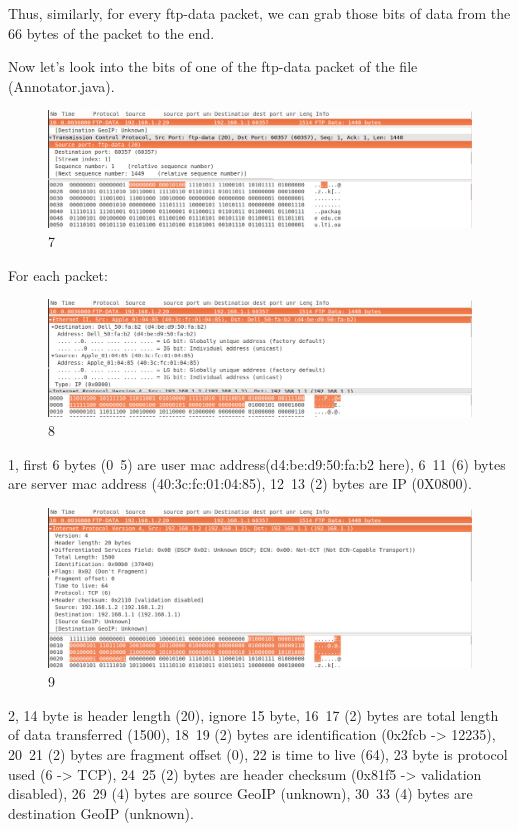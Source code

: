 \documentclass[a4paper,12pt]{article}
\begin{document}
Thus, similarly, for every ftp-data packet, we can grab those bits of data from the 66 bytes of the packet to the end.

Now let's look into the bits of one of the ftp-data packet of the file (Annotator.java). 

\begin{figure}[ht!]
\centering
\includegraphics[width=120mm]{6.png}
\caption{7 \label{overflow}}
\end{figure}

For each packet:

\begin{figure}[ht!]
\centering
\includegraphics[width=120mm]{7.png}
\caption{8 \label{overflow}}
\end{figure}

1, first 6 bytes (0~5) are user mac address(d4:be:d9:50:fa:b2 here), 6~11 (6) bytes are server mac address (40:3c:fc:01:04:85), 12~13 (2) bytes are IP (0X0800). 

\begin{figure}[ht!]
\centering
\includegraphics[width=120mm]{8.png}
\caption{9 \label{overflow}}
\end{figure}

2, 14 byte is header length (20), ignore 15 byte, 16~17 (2) bytes are total length of data transferred (1500), 18~19 (2) bytes are identification (0x2fcb -> 12235), 20~21 (2) bytes are fragment offset (0), 22 is time to live (64), 23 byte is protocol used (6 -> TCP), 24~25 (2) bytes are header checksum (0x81f5 -> validation disabled), 26~29 (4) bytes are source GeoIP (unknown), 30~33 (4) bytes are destination GeoIP (unknown).
\end{document}

